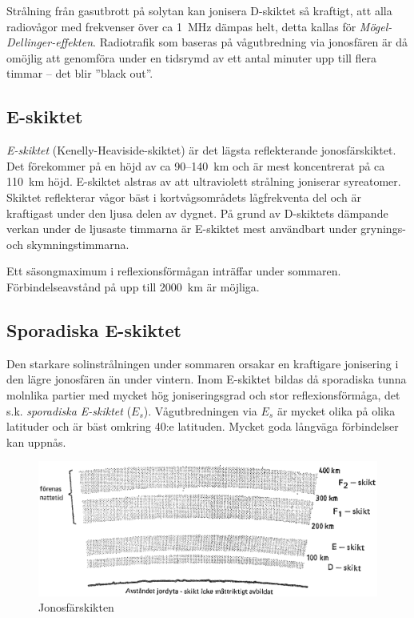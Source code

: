 Strålning från gasutbrott på solytan kan jonisera D-skiktet så
kraftigt, att alla radiovågor med frekvenser över ca 1~MHz dämpas helt,
detta kallas för \emph{Mögel-Dellinger-effekten}.
Radiotrafik som baseras på vågutbredning via jonosfären är då
omöjlig att genomföra under en tidsrymd av ett antal minuter upp till
flera timmar -- det blir ''black out''.

\subsection{E-skiktet}

\emph{E-skiktet} (Kenelly-Heaviside-skiktet) är det lägsta reflekterande
jonosfärskiktet.
Det förekommer på en höjd av ca 90--140~km och är mest koncentrerat på
ca 110~km höjd.
E-skiktet alstras av att ultraviolett strålning joniserar syreatomer.
Skiktet reflekterar vågor bäst i kortvågsområdets lågfrekventa del och är
kraftigast under den ljusa delen av dygnet.
På grund av D-skiktets dämpande verkan under de ljusaste timmarna är E-skiktet
mest användbart under grynings- och skymningstimmarna.

Ett säsongmaximum i reflexionsförmågan inträffar under sommaren.
Förbindelseavstånd på upp till 2000~km är möjliga.

\subsection{Sporadiska E-skiktet}

Den starkare solinstrålningen under sommaren orsakar en kraftigare
jonisering i den lägre jonosfären än under vintern.
Inom E-skiktet bildas då sporadiska tunna molnlika partier med mycket hög
joniseringsgrad och stor reflexionsförmåga, det s.k. \emph{sporadiska E-skiktet}
(\(E_s\)).
Vågutbredningen via \(E_s\) är mycket olika på olika latituder och är bäst
omkring 40:e latituden.
Mycket goda långväga förbindelser kan uppnås.

\begin{figure}
  \includegraphics[width=\textwidth]{images/cropped_pdfs/bild_2_7-07.pdf}
  \caption{Jonosfärskikten}
  \label{fig:bildII7-7}
\end{figure}

